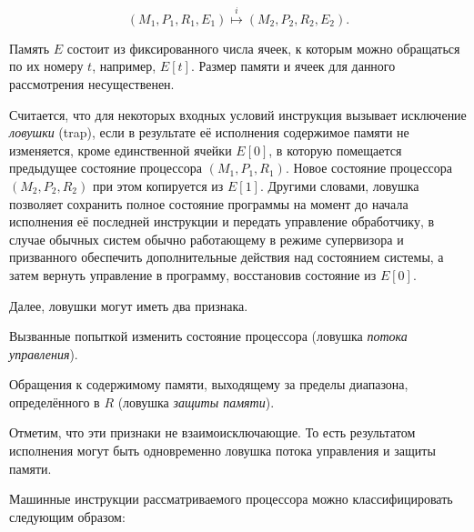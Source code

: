 $$(M_1,P_1,R_1,E_1) \overset{i}\mapsto (M_2,P_2,R_2,E_2).$$ 

Память $E$ состоит из фиксированного числа ячеек, к которым можно обращаться по их номеру $t$, например, $E[t]$. Размер памяти и ячеек для данного рассмотрения несущественен.

Считается, что для некоторых входных условий инструкция вызывает исключение \textit{ловушки} (\abbr trap), если в результате её исполнения содержимое памяти не изменяется, кроме единственной ячейки $E[0]$, в которую  помещается предыдущее состояние процессора $(M_1,P_1,R_1)$. Новое состояние процессора $(M_2,P_2,R_2)$ при этом копируется из $E[1]$. Другими словами, ловушка позволяет сохранить полное состояние программы на момент до начала исполнения её последней инструкции и передать управление обработчику, в случае обычных систем обычно работающему в режиме супервизора и призванного обеспечить дополнительные действия над состоянием системы, а затем вернуть управление в программу, восстановив состояние из $E[0]$.

Далее, ловушки могут иметь два признака.
\begin{enumerate*}
\item Вызванные попыткой изменить состояние процессора (ловушка \textit{потока управления}).

\item Обращения к содержимому памяти, выходящему за пределы диапазона, определённого в $R$ (ловушка \textit{защиты памяти}). 
\end{enumerate*}

Отметим, что эти признаки не взаимоисключающие. То есть результатом исполнения могут быть одновременно ловушка потока управления и защиты памяти.

Машинные инструкции рассматриваемого процессора можно классифицировать следующим образом:

